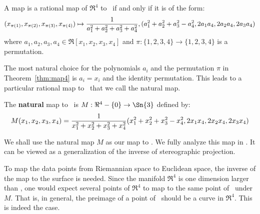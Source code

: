 \begin{theorem}
\label{thm:map4}
A map is a rational map of $\Re^4$ to \ if and only if
it is of the form:
\begin{equation}
\label{eq:re4s3}
\footnotesize{(x_{\pi(1)},x_{\pi(2)},x_{\pi(3)},x_{\pi(4)})} \mapsto 
\footnotesize{
	\frac{1}{a_1^2 + a_2^2 + a_3^2 + a_4^2},
	(a_1^2 + a_2^2 + a_3^2 - a_4^2, 2a_1a_4, 2a_2a_4, 2a_3a_4)
	}
\end{equation}
where $a_1,a_2,a_3,a_4 \in \Re[x_1,x_2,x_3,x_4]$
and $\pi : \{1,2,3,4\} \rightarrow \{1,2,3,4\}$ is a permutation.
\end{theorem}

\noindent The most natural choice for the polynomials $a_i$ and the permutation $\pi$ 
in Theorem~\ref{thm:map4} is $a_i = x_i$ and the identity permutation.
This leads to a particular rational map to \ that we call the natural map.
%
\begin{defn2}
The {\bf natural} map to \ is 
$M: \Re^4 - \{0\} \rightarrow \Sn{3}$ defined by:
\begin{equation}
\label{eqM}
\footnotesize{
	M(x_1,x_2,x_3,x_4) =
	\frac{1}{x_1^2 + x_2^2 + x_3^2 + x_4^2}
	(x_1^2 + x_2^2 + x_3^2 - x_4^2, 2x_1x_4, 2x_2x_4, 2x_3x_4)
	 }
\end{equation}
\end{defn2}
%
We shall use the natural map $M$ as our map to .
We fully analyze this map in \cite{jj98b}.
It can be viewed as a generalization of the inverse of stereographic projection.

To map the data points from Riemannian space to Euclidean space,
the inverse of the map to the surface is needed.
Since the manifold $\Re^4$ is one dimension larger than , one would expect
several points of $\Re^4$ to map to the same point of \ under $M$.
That is, in general, the preimage of a point of \ should be a curve in $\Re^4$.
This is indeed the case.

